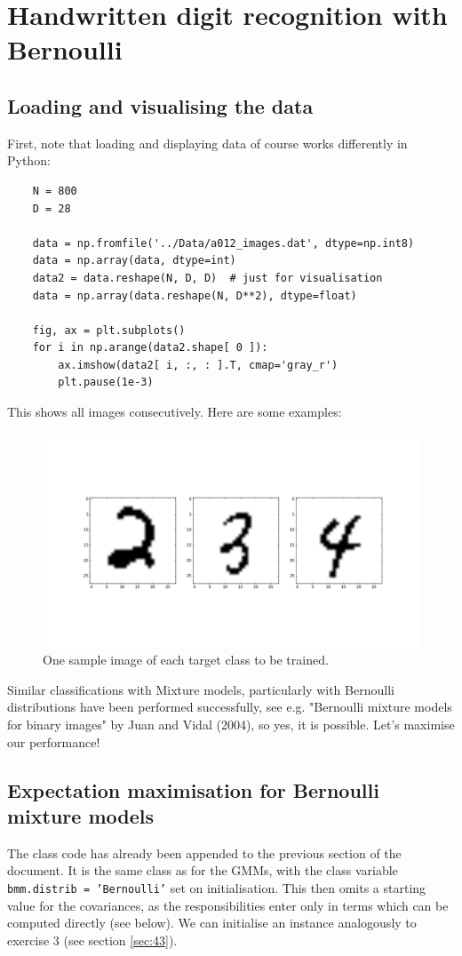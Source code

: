 \section{Handwritten digit recognition with Bernoulli}

\subsection{Loading and visualising the data}\label{sec:41}
First, note that loading and displaying data of course works differently in Python:
\begin{verbatim}
    N = 800
    D = 28

    data = np.fromfile('../Data/a012_images.dat', dtype=np.int8)
    data = np.array(data, dtype=int)
    data2 = data.reshape(N, D, D)  # just for visualisation
    data = np.array(data.reshape(N, D**2), dtype=float)

    fig, ax = plt.subplots()
    for i in np.arange(data2.shape[ 0 ]):
        ax.imshow(data2[ i, :, : ].T, cmap='gray_r')
        plt.pause(1e-3)
\end{verbatim}
This shows all images consecutively. Here are some examples:
\begin{figure}[H]
	\centering \includegraphics{../Figures/Ex41_examples.png}
	\caption{One sample image of each target class to be trained.}
	\label{fig:41_examples}
\end{figure}
Similar classifications with Mixture models, particularly with Bernoulli distributions have been performed successfully, see e.g. "Bernoulli mixture models for binary images" by Juan and Vidal (2004), so yes, it is possible. Let's maximise our performance!

\subsection{Expectation maximisation for Bernoulli mixture models}\label{sec:42}
The class code has already been appended to the previous section of the document. It is the same class as for the GMMs, with the class variable \texttt{bmm.distrib = 'Bernoulli'} set on initialisation. This then omits a starting value for the covariances, as the responsibilities enter only in terms which can be computed directly (see below).
We can initialise an instance analogously to exercise 3 (see section \ref{sec:43}).

